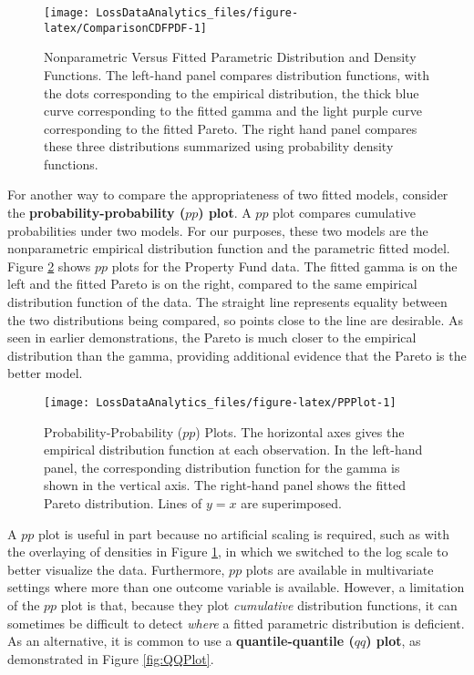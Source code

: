 \documentclass[]{book}
\theoremstyle{definition}
\theoremstyle{definition}
\theoremstyle{definition}
\theoremstyle{remark}
\begin{document}
\begin{figure}

{\centering \texttt{[image: LossDataAnalytics\_files/figure-latex/ComparisonCDFPDF-1]} 

}

\caption{Nonparametric Versus Fitted Parametric Distribution and Density Functions. The left-hand panel compares distribution functions, with the dots corresponding to the empirical distribution, the thick blue curve corresponding to the fitted gamma and the light purple curve corresponding to the fitted Pareto. The right hand panel compares these three distributions summarized using probability density functions.}\label{fig:ComparisonCDFPDF}
\end{figure}

For another way to compare the appropriateness of two fitted models,
consider the \textbf{probability-probability (\(pp\)) plot}. A \(pp\)
plot compares cumulative probabilities under two models. For our
purposes, these two models are the nonparametric empirical distribution
function and the parametric fitted model. Figure \ref{fig:PPPlot} shows
\(pp\) plots for the Property Fund data. The fitted gamma is on the left
and the fitted Pareto is on the right, compared to the same empirical
distribution function of the data. The straight line represents equality
between the two distributions being compared, so points close to the
line are desirable. As seen in earlier demonstrations, the Pareto is
much closer to the empirical distribution than the gamma, providing
additional evidence that the Pareto is the better model.

\begin{figure}

{\centering \texttt{[image: LossDataAnalytics\_files/figure-latex/PPPlot-1]} 

}

\caption{Probability-Probability ($pp$) Plots. The horizontal axes gives the empirical distribution function at each observation. In the left-hand panel, the corresponding distribution function for the gamma is shown in the vertical axis. The right-hand panel shows the fitted Pareto distribution. Lines of $y=x$ are superimposed.}\label{fig:PPPlot}
\end{figure}

A \(pp\) plot is useful in part because no artificial scaling is
required, such as with the overlaying of densities in Figure
\ref{fig:ComparisonCDFPDF}, in which we switched to the log scale to
better visualize the data. Furthermore, \(pp\) plots are available in
multivariate settings where more than one outcome variable is available.
However, a limitation of the \(pp\) plot is that, because they plot
\emph{cumulative} distribution functions, it can sometimes be difficult
to detect \emph{where} a fitted parametric distribution is deficient. As
an alternative, it is common to use a \textbf{quantile-quantile (\(qq\))
plot}, as demonstrated in Figure \ref{fig:QQPlot}.
\end{document}
